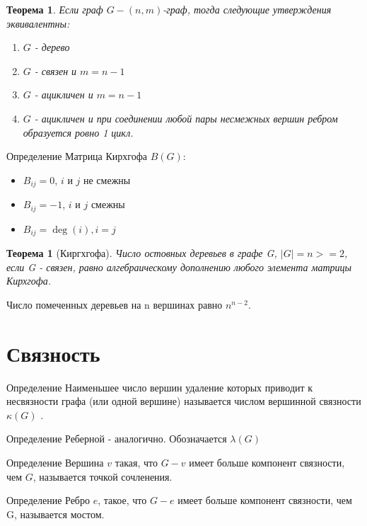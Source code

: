 \documentclass[a4paper,openany]{book}
\newcounter{TheoremCounter}
\newtheorem{theorem}[TheoremCounter]{Теорема}
\newenvironment{definition}
{\begin{statement}{Определение}}
    {\end{statement}}
\newenvironment{consequence}{}{}
\begin{document}
\begin{theorem}
  Если граф $G - (n,m)$-граф, тогда следующие утверждения эквивалентны:
  \begin{enumerate}
    \item $G$ - дерево
    \item $G$ - связен и $m=n-1$
    \item $G$ - ацикличен и $m=n-1$
    \item $G$ - ацикличен и при соединении любой пары несмежных вершин ребром
    образуется ровно 1 цикл.
  \end{enumerate}
\end{theorem}

\begin{definition}
  Матрица Кирхгофа $B(G)$:
  \begin{itemize}
    \item $B_{ij} = 0$, $i$ и $j$ не смежны
    \item $B_{ij} = -1$, $i$ и $j$ смежны
    \item $B_{ij} = \deg(i), i = j$
  \end{itemize}
\end{definition}

\begin{theorem}[Киргхгофа]
  Число остовных деревьев в графе G, $|G| = n >= 2$, если G - связен, равно
  алгебраическому дополнению любого элемента матрицы Кирхгофа.
\end{theorem}

\begin{consequence}
  Число помеченных деревьев на n вершинах равно $n^{n-2}$.
\end{consequence}
\chapter{Связность}
\begin{definition}
  Наименьшее число вершин удаление которых приводит к несвязности графа (или одной вершине) называется числом вершинной связности $\kappa(G)$ .
\end{definition}
\begin{definition}
  Реберной - аналогично. Обозначается $\lambda(G)$
\end{definition}
\begin{definition}
  Вершина $v$ такая, что $G-v$ имеет больше компонент связности, чем $G$, называется точкой сочленения.
\end{definition}
\begin{definition}
  Ребро $e$, такое, что $G-e$ имеет больше компонент связности, чем G, называется мостом.
\end{definition}
\end{document}
